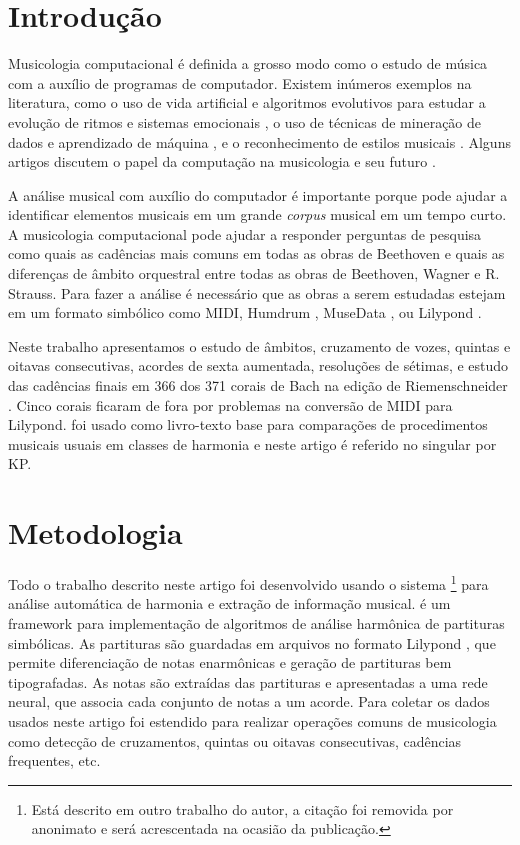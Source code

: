 \section{Introdução}
\label{sec:introducao}

Musicologia computacional é definida a grosso modo como o estudo de
música com a auxílio de programas de computador. Existem inúmeros
exemplos na literatura, como o uso de vida artificial e algoritmos
evolutivos para estudar a evolução de ritmos e sistemas emocionais
\cite{coutinho05:conputational}, o uso de técnicas de mineração de
dados e aprendizado de máquina \cite{hartmann07:interactive}, e o
reconhecimento de estilos musicais
\cite{kranenburg04:_music_style_recog_quant_approac}. Alguns artigos
discutem o papel da computação na musicologia e seu futuro
\cite{kugel92:beyond,honing04:comeback,cook05:towards}.

A análise musical com auxílio do computador é importante porque pode
ajudar a identificar elementos musicais em um grande \textit{corpus}
musical em um tempo curto. A musicologia computacional pode ajudar a
responder perguntas de pesquisa como quais as cadências mais comuns em
todas as obras de Beethoven e quais as diferenças de âmbito orquestral
entre todas as obras de Beethoven, Wagner e R. Strauss. Para fazer a
análise é necessário que as obras a serem estudadas estejam em um
formato simbólico como MIDI, Humdrum
\cite{huron99:music_resear_using_humdr}, MuseData
\cite{selfridge-field93:musedata}, ou Lilypond
\cite{nienhuys.ea08:lilypond}.

Neste trabalho apresentamos o estudo de âmbitos, cruzamento de vozes,
quintas e oitavas consecutivas, acordes de sexta aumentada, resoluções
de sétimas, e estudo das cadências finais em 366 dos 371 corais de
Bach na edição de Riemenschneider \cite{bach41:371}. Cinco corais
ficaram de fora por problemas na conversão de MIDI para Lilypond.
\cite{kostka.ea00:tonal} foi usado como livro-texto base para
comparações de procedimentos musicais usuais em classes de harmonia e
neste artigo é referido no singular por KP.

\section{Metodologia}
\label{sec:metodologia}

Todo o trabalho descrito neste artigo foi desenvolvido usando o
sistema \rameau{}\footnote{Está descrito em outro trabalho do autor, a
  citação foi removida por anonimato e será acrescentada na ocasião da
  publicação.} para análise automática de harmonia e extração de
informação musical. \rameau{} é um framework para implementação de
algoritmos de análise harmônica de partituras simbólicas. As
partituras são guardadas em arquivos no formato Lilypond
\cite{nienhuys.ea08:lilypond}, que permite diferenciação de notas
enarmônicas e geração de partituras bem tipografadas. As notas são
extraídas das partituras e apresentadas a uma rede neural, que associa
cada conjunto de notas a um acorde. Para coletar os dados usados neste
artigo \rameau{} foi estendido para realizar operações comuns de
musicologia como detecção de cruzamentos, quintas ou oitavas
consecutivas, cadências frequentes, etc.

